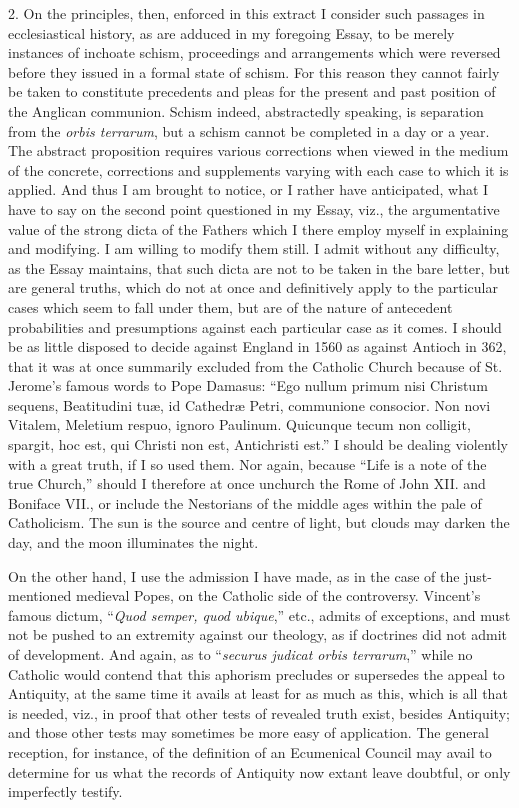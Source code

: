 2. On the principles, then, enforced in this extract I consider
such passages in ecclesiastical history, as are adduced in my
foregoing Essay, to be merely instances of inchoate schism,
proceedings and arrangements which were reversed before they issued in
a formal state of schism. For this reason they cannot fairly be taken
to constitute precedents and pleas for the present and past position
of the Anglican communion. Schism indeed, abstractedly speaking, is
separation from the \emph{orbis terrarum}, but a schism cannot be
completed in a day or a year. The abstract proposition requires
various corrections when viewed in the medium of the concrete,
corrections and supplements varying with each case to which it is
applied. And thus I am brought to notice, or I rather have
anticipated, what I have to say on the second point questioned in my
Essay, viz., the argumentative value of the strong dicta of the
Fathers which I there employ myself in explaining and modifying.
I am willing to modify them still. I admit without any difficulty, as
the Essay maintains, that such dicta are not to be taken in the bare
letter, but are general truths, which do not at once and definitively
apply to the particular cases which seem to fall under them, but are
of the nature of antecedent probabilities and presumptions against
each particular case as it comes. I should be as little disposed to
decide against England in 1560 as against Antioch in 362, that it was
at once summarily excluded from the Catholic Church because of St.
Jerome's famous words to Pope Damasus: ``Ego nullum primum nisi
Christum sequens, Beatitudini tuæ, id Cathedræ Petri, communione
consocior. Non novi Vitalem, Meletium respuo, ignoro Paulinum.
Quicunque tecum non colligit, spargit, hoc est, qui Christi non est,
Antichristi est.'' I should be dealing violently with a great
truth, if I so used them. Nor again, because ``Life is a note of
the true Church,'' should I therefore at once unchurch the Rome of
John XII. and Boniface VII., or include the Nestorians of the middle
ages within the pale of Catholicism. The sun is the source and centre
of light, but clouds may darken the day, and the moon illuminates the
night.

On the other hand, I use the admission I have made, as in the case
of the just-mentioned medieval Popes, on the Catholic side of the
controversy. Vincent's famous dictum, ``\emph{Quod semper, quod
ubique},'' etc., admits of exceptions, and must not be pushed
to an extremity against our theology, as if doctrines did not admit of
development. And again, as to ``\emph{securus judicat orbis terrarum},''
while no Catholic would contend that this aphorism precludes or
supersedes the appeal to Antiquity, at the same time it avails at
least for as much as this, which is all that is needed, viz., in proof
that other tests of revealed truth exist, besides Antiquity; and
those other tests may sometimes be more easy of application. The
general reception, for instance, of the definition of an Ecumenical
Council may avail to determine for us what the records of Antiquity
now extant leave doubtful, or only imperfectly testify.

